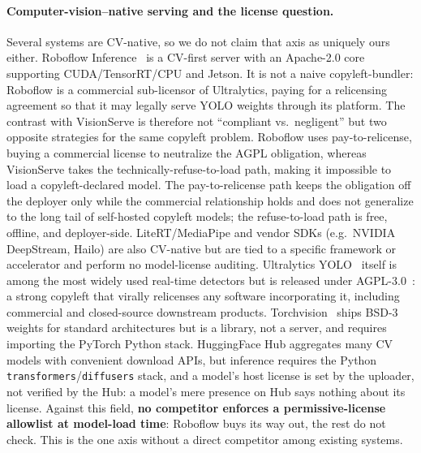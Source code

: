 \paragraph{Computer-vision--native serving and the license question.}
Several systems are CV-native, so we do not claim that axis as uniquely ours
either. Roboflow Inference~\cite{roboflowinfer} is a CV-first server with an
Apache-2.0 core supporting CUDA/TensorRT/CPU and Jetson. It is
not a naive copyleft-bundler: Roboflow is a commercial
sub-licensor of Ultralytics, paying for a relicensing agreement so that it may
legally serve YOLO weights through its platform. The contrast with VisionServe
is therefore not ``compliant vs.\ negligent'' but two opposite strategies
for the same copyleft problem. Roboflow uses pay-to-relicense, buying a
commercial license to neutralize the AGPL obligation, whereas VisionServe
takes the technically-refuse-to-load path, making it impossible to load a
copyleft-declared model. The pay-to-relicense path
keeps the obligation off the deployer only while the commercial relationship
holds and does not generalize to the long tail of self-hosted copyleft models;
the refuse-to-load path is free, offline, and deployer-side.
LiteRT/MediaPipe and vendor SDKs (e.g.\ NVIDIA DeepStream, Hailo) are also
CV-native but are tied to a specific framework or accelerator and perform no
model-license auditing.
Ultralytics YOLO~\cite{ultralytics2023yolo} itself is among the most widely
used real-time detectors but is released under AGPL-3.0~\cite{agpllicense}: a
strong copyleft that virally relicenses any software incorporating it,
including commercial and closed-source downstream products.
Torchvision~\cite{torchvision2023} ships BSD-3 weights for standard
architectures but is a library, not a server, and requires importing the
PyTorch Python stack.
HuggingFace Hub aggregates many CV models with convenient download APIs, but
inference requires the Python \texttt{transformers}/\texttt{diffusers} stack,
and a model's host license is set by the uploader, not verified by the Hub:
a model's mere presence on Hub says nothing about its license.
Against this field, \textbf{no competitor enforces a permissive-license
allowlist at model-load time}: Roboflow buys its way out, the rest do not
check. This is the one axis without a direct competitor among existing systems.

